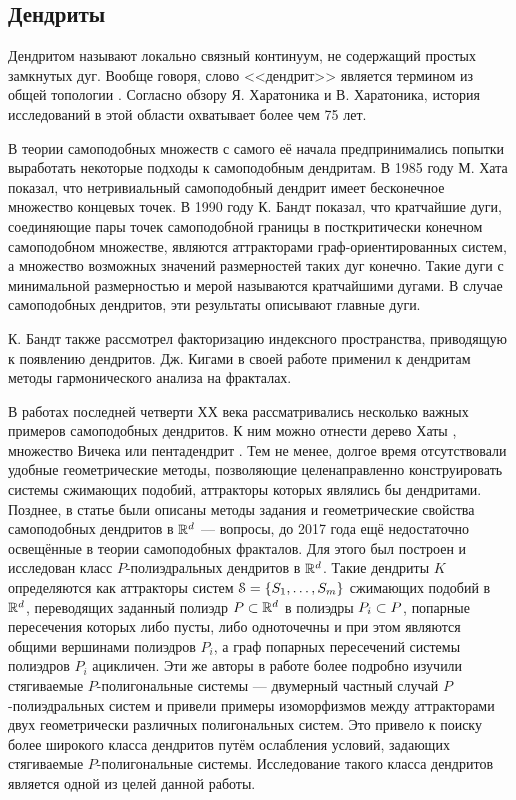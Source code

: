 \subsection{Дендриты}

Дендритом называют локально связный континуум, не содержащий простых замкнутых дуг.
Вообще говоря, слово <<дендрит>> является термином из общей топологии \cite{Kur1, Kur2}. 
Согласно обзору \cite{Char1998} Я. Харатоника и В. Харатоника, история исследований в этой области охватывает более чем 75 лет.

В теории самоподобных множеств с самого её начала предпринимались попытки выработать некоторые подходы к самоподобным дендритам.
В 1985 году М. Хата \cite{Hata1985} показал, что нетривиальный самоподобный дендрит имеет бесконечное множество концевых точек.
В 1990 году К. Бандт \cite{SSS6} показал, что кратчайшие дуги, соединяющие пары точек самоподобной границы в посткритически конечном самоподобном множестве, являются аттракторами граф-ориентированных систем, а множество возможных значений размерностей таких дуг конечно.
Такие дуги с минимальной размерностью и мерой называются кратчайшими дугами.
В случае самоподобных дендритов, эти результаты описывают главные дуги.

К. Бандт также рассмотрел \cite{SSS2} факторизацию индексного пространства, приводящую к появлению дендритов.
Дж. Кигами в своей работе \cite{Kig95} применил к дендритам методы гармонического анализа на фракталах.

 
В работах последней четверти ХХ века рассматривались несколько важных примеров самоподобных дендритов.
К ним можно отнести дерево Хаты \cite{Hata1985}, множество Вичека или пентадендрит \cite{McWorter1987}.
Тем не менее, долгое время отсутствовали удобные геометрические методы, позволяющие целенаправленно конструировать системы сжимающих подобий, аттракторы которых являлись бы дендритами.
Позднее, в статье \cite{TSV2017} были описаны методы задания и геометрические свойства самоподобных дендритов в $\mathbb{R}^d$ --- вопросы, до 2017 года ещё недостаточно освещённые в теории самоподобных фракталов.
Для этого был построен и исследован класс $P$-полиэдральных дендритов в $\mathbb{R}^d$.
Такие дендриты $K$ определяются как аттракторы систем ${\EuScript S} = \{S_1,\ldots, S_m\}$ сжимающих подобий в $\mathbb{R}^d$, переводящих заданный полиэдр $P \subset \mathbb{R}^d$ в полиэдры $P_i \subset P$, попарные пересечения которых либо пусты, либо одноточечны и при этом являются общими вершинами полиэдров $P_i $, а граф попарных пересечений системы полиэдров $P_i$ ацикличен.
Эти же авторы в работе \cite{STV2017} более подробно изучили стягиваемые $P$-полигональные системы --- двумерный частный случай $P$-полиэдральных систем и привели
примеры изоморфизмов между аттракторами двух геометрически различных полигональных систем.
Это привело к поиску более широкого класса дендритов путём ослабления условий, задающих стягиваемые $P$-полигональные системы.
Исследование такого класса дендритов является одной из целей данной работы.

